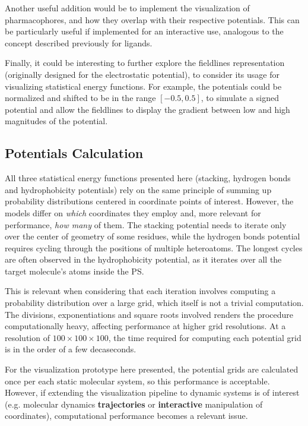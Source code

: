     Another useful addition would be to implement the visualization of pharmacophores, and how they overlap with their respective potentials. This can be particularly useful if implemented for an interactive use, analogous to the concept described previously for ligands.

    Finally, it could be interesting to further explore the fieldlines representation (originally designed for the electrostatic potential), to consider its usage for visualizing statistical energy functions. For example, the potentials could be normalized and shifted to be in the range $[-0.5, 0.5]$, to simulate a signed potential and allow the fieldlines to display the gradient between low and high magnitudes of the potential.

  \subsection{Potentials Calculation}
    All three statistical energy functions presented here (stacking, hydrogen bonds and hydrophobicity potentials) rely on the same principle of summing up probability distributions centered in coordinate points of interest. However, the models differ on \textit{which} coordinates they employ and, more relevant for performance, \textit{how many} of them. The stacking potential needs to iterate only over the center of geometry of some residues, while the hydrogen bonds potential requires cycling through the positions of multiple heteroatoms. The longest cycles are often observed in the hydrophobicity potential, as it iterates over all the target molecule's atoms inside the PS.

    This is relevant when considering that each iteration involves computing a probability distribution over a large grid, which itself is not a trivial computation. The divisions, exponentiations and square roots involved renders the procedure computationally heavy, affecting performance at higher grid resolutions. At a resolution of $100 \times 100 \times 100$, the time required for computing each potential grid is in the order of a few decaseconds.

    For the visualization prototype here presented, the potential grids are calculated once per each static molecular system, so this performance is acceptable. However, if extending the visualization pipeline to dynamic systems is of interest (e.g. molecular dynamics \textbf{trajectories} or \textbf{interactive} manipulation of coordinates), computational performance becomes a relevant issue.

